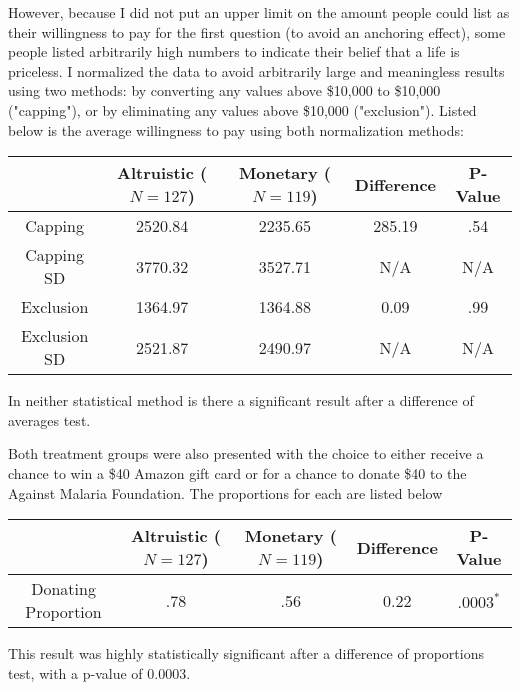 \documentclass[12pt]{article}
\begin{document}
However, because I did not put an upper limit on the amount people could list as their willingness to pay for the first question (to avoid an anchoring effect), some people listed arbitrarily high numbers to indicate their belief that a life is priceless. I normalized the data to avoid arbitrarily large and meaningless results using two methods: by converting any values above \$10,000 to \$10,000 ("capping"), or by eliminating any values above \$10,000 ("exclusion"). Listed below is the average willingness to pay using both normalization methods:

\begin{center}
    \begin{tabular}{c| c c | c c}
         & \parbox[t]{2cm}{\textbf{Altruistic}\\($N = 127$)} & \parbox[t]{2cm}{\textbf{Monetary}\\($N = 119$)} & \textbf{Difference} & \textbf{P-Value}\\
         \hline
         Capping & 2520.84 & 2235.65 & 285.19 & .54\\
         Capping SD & 3770.32 & 3527.71 & N/A & N/A\\
         Exclusion & 1364.97 & 1364.88 & 0.09 & .99\\
         Exclusion SD & 2521.87 & 2490.97 & N/A & N/A
    \end{tabular}
\end{center}
In neither statistical method is there a significant result after a difference of averages test. 

Both treatment groups were also presented with the choice to either receive a chance to win a \$40 Amazon gift card or for a chance to donate \$40 to the Against Malaria Foundation. The proportions for each are listed below

\begin{center}
    \begin{tabular}{c| c c | c c}
         & \parbox[t]{2cm}{\textbf{Altruistic}\\($N = 127$)} & \parbox[t]{2cm}{\textbf{Monetary}\\($N = 119$)} & \textbf{Difference} & \textbf{P-Value}\\
         \hline
         Donating Proportion & .78 & .56 & 0.22 &  $.0003^{*}$
    \end{tabular}
\end{center}
This result was highly statistically significant after a difference of proportions test, with a p-value of 0.0003. 
\end{document}
